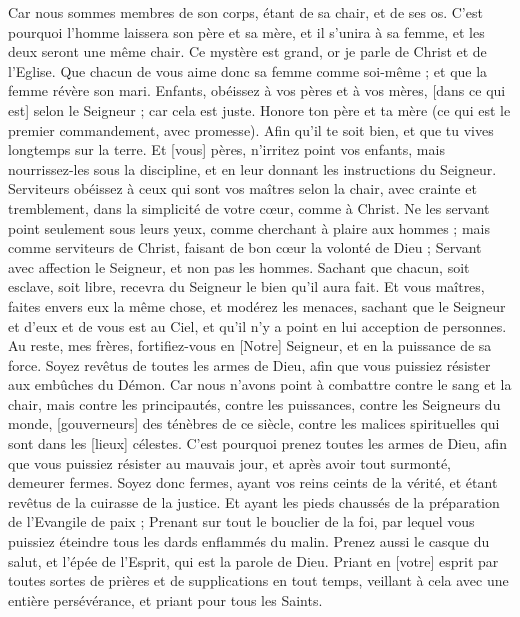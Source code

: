 \begin{multicols}{2}
Car nous sommes membres de son corps, étant de sa chair, et de ses os.
C'est pourquoi l'homme laissera son père et sa mère, et il s'unira à sa femme, et les deux seront une même chair.
Ce mystère est grand, or je parle de Christ et de l'Eglise.
Que chacun de vous aime donc sa femme comme soi-même ; et que la femme révère son mari.
\VerseOne{}Enfants, obéissez à vos pères et à vos mères, [dans ce qui est] selon le Seigneur ; car cela est juste.
Honore ton père et ta mère (ce qui est le premier commandement, avec promesse).
Afin qu'il te soit bien, et que tu vives longtemps sur la terre.
Et [vous] pères, n'irritez point vos enfants, mais nourrissez-les sous la discipline, et en leur donnant les instructions du Seigneur.
Serviteurs obéissez à ceux qui sont vos maîtres selon la chair, avec crainte et tremblement, dans la simplicité de votre cœur, comme à Christ.
Ne les servant point seulement sous leurs yeux, comme cherchant à plaire aux hommes ; mais comme serviteurs de Christ, faisant de bon cœur la volonté de Dieu ;
Servant avec affection le Seigneur, et non pas les hommes.
Sachant que chacun, soit esclave, soit libre, recevra du Seigneur le bien qu'il aura fait.
Et vous maîtres, faites envers eux la même chose, et modérez les menaces, sachant que le Seigneur et d'eux et de vous est au Ciel, et qu'il n'y a point en lui acception de personnes.
Au reste, mes frères, fortifiez-vous en [Notre] Seigneur, et en la puissance de sa force.
Soyez revêtus de toutes les armes de Dieu, afin que vous puissiez résister aux embûches du Démon.
Car nous n'avons point à combattre contre le sang et la chair, mais contre les principautés, contre les puissances, contre les Seigneurs du monde, [gouverneurs] des ténèbres de ce siècle, contre les malices spirituelles qui sont dans les [lieux] célestes.
C'est pourquoi prenez toutes les armes de Dieu, afin que vous puissiez résister au mauvais jour, et après avoir tout surmonté, demeurer fermes.
Soyez donc fermes, ayant vos reins ceints de la vérité, et étant revêtus de la cuirasse de la justice.
Et ayant les pieds chaussés de la préparation de l'Evangile de paix ;
Prenant sur tout le bouclier de la foi, par lequel vous puissiez éteindre tous les dards enflammés du malin.
Prenez aussi le casque du salut, et l'épée de l'Esprit, qui est la parole de Dieu.
Priant en [votre] esprit par toutes sortes de prières et de supplications en tout temps, veillant à cela avec une entière persévérance, et priant pour tous les Saints.

\end{multicols}
